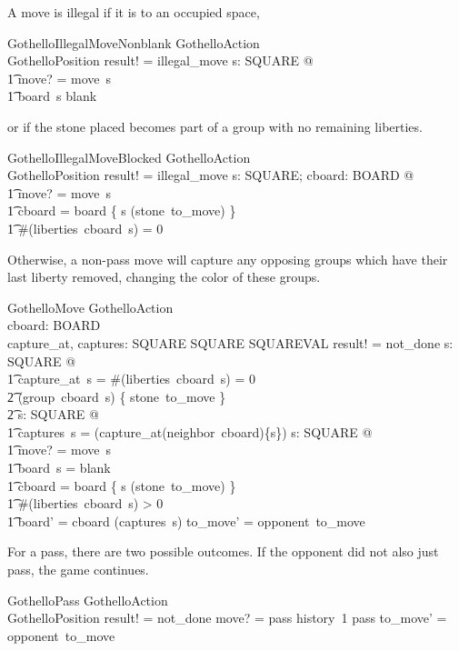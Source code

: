 \documentclass{article}
\begin{document}
A move is illegal if it is to an occupied space,
\begin{schema}{GothelloIllegalMoveNonblank}
  GothelloAction \\
  \Xi GothelloPosition
\where
  result! = illegal\_move
\also
  \exists s: SQUARE @ \\
  \t1 move? = move~s \land \\
  \t1 board~s \neq blank
\end{schema}
or if the stone placed becomes part of a group
with no remaining liberties.
\begin{schema}{GothelloIllegalMoveBlocked}
  GothelloAction \\
  \Xi GothelloPosition
\where
  result! = illegal\_move
\also
  \exists s: SQUARE; cboard: BOARD @ \\
  \t1 move? = move~s \land \\
  \t1 cboard = board \oplus \{ s \mapsto (stone~to\_move) \} \land \\
  \t1 \#(liberties~cboard~s) = 0
\end{schema}

Otherwise, a non-pass move will capture any opposing groups
which have their last liberty removed, changing the color of
these groups.
\begin{schema}{GothelloMove}
  GothelloAction \\
  cboard: BOARD \\
  capture\_at, captures: SQUARE \fun SQUARE \pfun SQUAREVAL
\where
  result! = not\_done
\also
  \forall s: SQUARE @ \\
  \t1 capture\_at~s = \IF \#(liberties~cboard~s) = 0 \\
  \t2   \THEN (group~cboard~s) \cross \{ stone~to\_move \} \\
  \t2   \ELSE \emptyset
\also
  \forall s: SQUARE @ \\
  \t1 captures~s = \bigcup (capture\_at\limg(neighbor~cboard)\limg\{s\}\rimg\rimg)
\also
  \exists s: SQUARE @ \\
  \t1 move? = move~s \land \\
  \t1 board~s = blank \land \\
  \t1 cboard = board \oplus \{ s \mapsto (stone~to\_move) \} \land \\
  \t1 \#(liberties~cboard~s) > 0 \land \\
  \t1 board' = cboard \oplus (captures~s)
\also
  to\_move' = opponent~to\_move
\end{schema}

For a pass, there are two possible outcomes.  If the
opponent did not also just pass, the game continues.
\begin{schema}{GothelloPass}
  GothelloAction \\
  \Xi GothelloPosition
\where
  result! = not\_done
\also
  move? = pass
\also
  history~1 \neq pass
\also
  to\_move' = opponent~to\_move
\end{schema}
\end{document}
